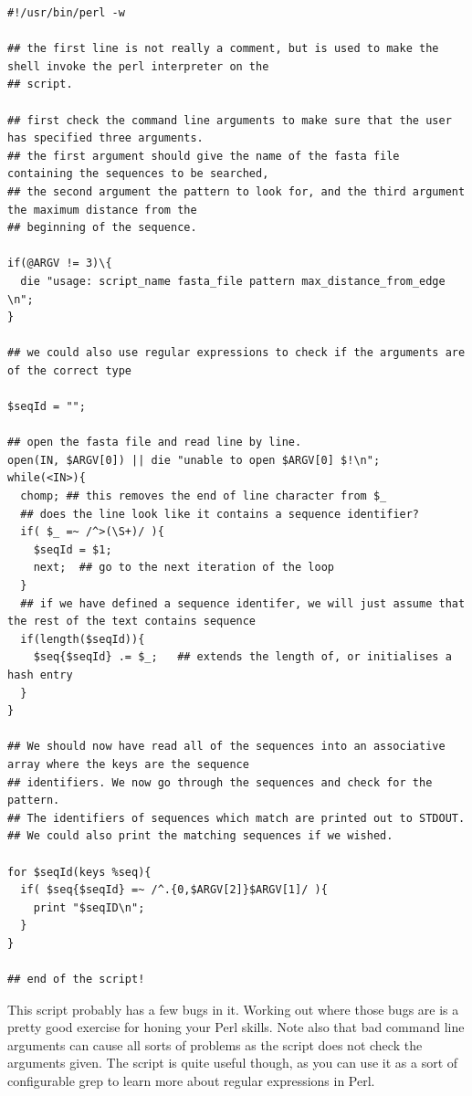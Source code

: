 \documentclass[11pt]{article}
\begin{document}
\begin{verbatim}
#!/usr/bin/perl -w

## the first line is not really a comment, but is used to make the shell invoke the perl interpreter on the
## script.

## first check the command line arguments to make sure that the user has specified three arguments.
## the first argument should give the name of the fasta file containing the sequences to be searched,
## the second argument the pattern to look for, and the third argument the maximum distance from the
## beginning of the sequence.

if(@ARGV != 3)\{
  die "usage: script_name fasta_file pattern max_distance_from_edge \n";
}

## we could also use regular expressions to check if the arguments are of the correct type

$seqId = "";

## open the fasta file and read line by line.
open(IN, $ARGV[0]) || die "unable to open $ARGV[0] $!\n";
while(<IN>){
  chomp; ## this removes the end of line character from $_
  ## does the line look like it contains a sequence identifier?
  if( $_ =~ /^>(\S+)/ ){
    $seqId = $1;
    next;  ## go to the next iteration of the loop
  }
  ## if we have defined a sequence identifer, we will just assume that the rest of the text contains sequence
  if(length($seqId)){
    $seq{$seqId} .= $_;   ## extends the length of, or initialises a hash entry
  }
}

## We should now have read all of the sequences into an associative array where the keys are the sequence
## identifiers. We now go through the sequences and check for the pattern.
## The identifiers of sequences which match are printed out to STDOUT.
## We could also print the matching sequences if we wished.

for $seqId(keys %seq){
  if( $seq{$seqId} =~ /^.{0,$ARGV[2]}$ARGV[1]/ ){
    print "$seqID\n";
  }
}

## end of the script!
\end{verbatim}

This script probably has a few bugs in it. Working out where those bugs
are is a pretty good exercise for honing your Perl skills. Note also
that bad command line arguments can cause all sorts of problems as the
script does not check the arguments given. The script is quite useful
though, as you can use it as a sort of configurable grep to learn more
about regular expressions in Perl.
\end{document}
